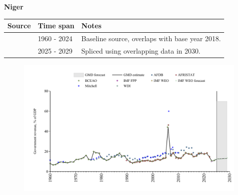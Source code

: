 \documentclass[12pt,a4paper,landscape]{article}
\begin{document}
\begin{adjustbox}{max totalsize={\paperwidth}{\paperheight},center}
\begin{minipage}[t][\textheight][t]{\textwidth}
\vspace*{0.5cm}
{}
\begin{center}
{\Large\bfseries Niger}
\end{center}
\vspace{0.5cm}
\begin{table}[H]
\centering
\small
\begin{tabular}{|l|l|l|}
\hline
\textbf{Source} & \textbf{Time span} & \textbf{Notes} \\
\hline
\rowcolor{white}\cite{BCEAO}& 1960 - 2024 &Baseline source, overlaps with base year 2018.\\
\rowcolor{lightgray}\cite{IMF_WEO_forecast}& 2025 - 2029 &Spliced using overlapping data in 2030.\\
\hline
\end{tabular}
\end{table}
\begin{figure}[H]
\centering
\includegraphics[width=\textwidth,height=0.6\textheight,keepaspectratio]{graphs/NER_govrev_GDP.pdf}
\end{figure}
\end{minipage}
\end{adjustbox}
\end{document}
